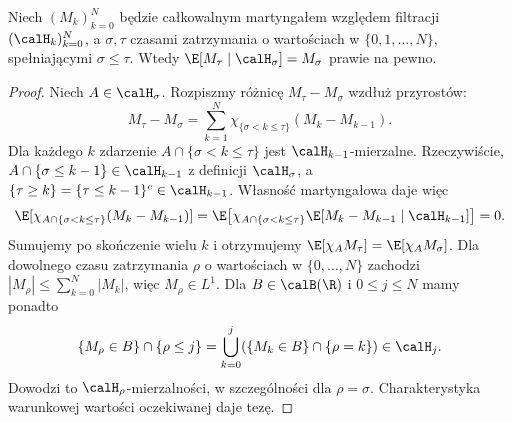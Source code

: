 \begin{lemat}
\label{lem:disc-optional}
Niech $(M_k)_{k=0}^N$ będzie całkowalnym martyngałem
względem filtracji $(\calH_k)_{k=0}^N$,
a $\sigma,\tau$ czasami zatrzymania o wartościach w
$\{0,1,\ldots,N\}$, spełniającymi $\sigma\le\tau$.
Wtedy $\E[M_\tau\mid\calH_\sigma]=M_\sigma$
prawie na pewno.
\end{lemat}
\begin{proof}
Niech $A\in\calH_\sigma$. Rozpiszmy różnicę
$M_\tau-M_\sigma$ wzdłuż przyrostów:
\[
M_\tau-M_\sigma
=\sum_{k=1}^N\chi_{\{\sigma<k\le\tau\}}
(M_k-M_{k-1}).
\]
Dla każdego $k$ zdarzenie
$A\cap\{\sigma<k\le\tau\}$ jest $\calH_{k-1}$-mierzalne.
Rzeczywiście,
$A\cap\{\sigma\le k-1\}\in\calH_{k-1}$
z definicji $\calH_\sigma$, a
$\{\tau\ge k\}=\{\tau\le k-1\}^c\in\calH_{k-1}$.
Własność martyngałowa daje więc
\[
\E[\chi_{A\cap\{\sigma<k\le\tau\}}(M_k-M_{k-1})]
=\E\!\left[\chi_{A\cap\{\sigma<k\le\tau\}}
\E[M_k-M_{k-1}\mid\calH_{k-1}]\right]=0.
\]
Sumujemy po skończenie wielu $k$ i otrzymujemy
$\E[\chi_A M_\tau]=\E[\chi_A M_\sigma]$.
Dla dowolnego czasu zatrzymania $\rho$ o wartościach
w $\{0,\ldots,N\}$ zachodzi
$|M_\rho|\le\sum_{k=0}^N|M_k|$, więc $M_\rho\in L^1$.
Dla $B\in\calB(\R)$ i $0\le j\le N$ mamy ponadto
\[
\{M_\rho\in B\}\cap\{\rho\le j\}
=\bigcup_{k=0}^j(\{M_k\in B\}\cap\{\rho=k\})\in\calH_j.
\]
Dowodzi to $\calH_\rho$-mierzalności, w szczególności
dla $\rho=\sigma$. Charakterystyka warunkowej
wartości oczekiwanej daje tezę.
\end{proof}

